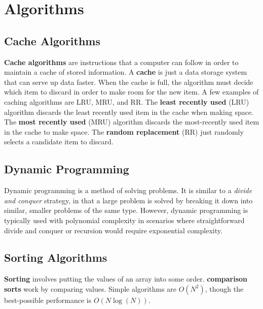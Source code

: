 \section{Algorithms}

\subsection{Cache Algorithms}

\textbf{Cache algorithms} are instructions that a computer can follow in order to maintain a cache of stored information. A \textbf{cache} is just a data storage system that can serve up data faster. When the cache is full, the algorithm must decide which item to discard in order to make room for the new item. A few examples of caching algorithms are LRU, MRU, and RR. The \textbf{least recently used} (LRU) algorithm discards the least recently used item in the cache when making space. The \textbf{most recently used} (MRU) algorithm discards the most-recently used item in the cache to make space. The \textbf{random replacement} (RR) just randomly selects a candidate item to discard. 

\subsection{Dynamic Programming}

Dynamic programming is a method of solving problems. It is similar to a \textit{divide and conquer} strategy, in that a large problem is solved by breaking it down into similar, smaller problems of the same type. However, dynamic programming is typically used with polynomial complexity in scenarios where straightforward divide and conquer or recursion would require exponential complexity.

\subsection{Sorting Algorithms}

\textbf{Sorting} involves putting the values of an array into some order. \textbf{comparison sorts} work by comparing values. Simple algorithms are $O(N^{2})$, though the best-possible performance is $O(N\log(N))$. \\

